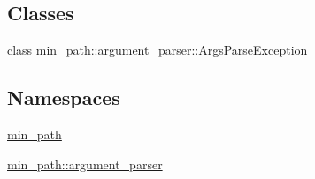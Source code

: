 \subsection*{Classes}
\begin{DoxyCompactItemize}
\item 
class \hyperlink{a00001}{min\+\_\+path\+::argument\+\_\+parser\+::\+Args\+Parse\+Exception}
\end{DoxyCompactItemize}
\subsection*{Namespaces}
\begin{DoxyCompactItemize}
\item 
 \hyperlink{a00033}{min\+\_\+path}
\item 
 \hyperlink{a00034}{min\+\_\+path\+::argument\+\_\+parser}
\end{DoxyCompactItemize}
